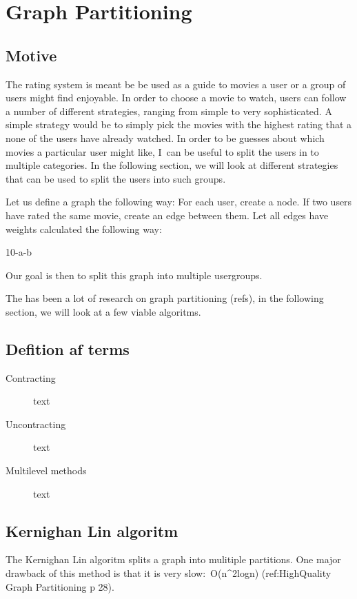 \newpage
\chapter{Graph Partitioning}
\label{chap:Graph_Partitioning}
\section{Motive}
The rating system is meant  be be used as a guide to  movies a user or a group
of users might find enjoyable. In order to choose a movie to watch, users can follow a
number of different strategies, ranging from simple to very sophisticated.
A simple strategy would be to simply pick the movies with the highest rating
that a none of the users have already watched. In order to be guesses about which movies  a particular user might like, I\ can be useful to split the users in to multiple categories. In the following section, we will look at different strategies that can be used to split the users into such groups.

Let us define a graph the following way:
For each user, create a node.
If two users have rated the same movie, create an edge between them.
Let all edges have weights calculated the following way:

10-\textbar a-b\textbar\ 

Our goal is then to split this graph into multiple usergroups.

The has been a lot of research on graph partitioning (refs), in the following section, we will look at a few viable algoritms.

\section{Defition af terms}

\begin{description}
\item[Contracting] 
text
\item[Uncontracting] 
text
\item[Multilevel methods] 
text

\end{description}\section{Kernighan Lin algoritm}
The Kernighan Lin algoritm splits a graph into mulitiple partitions. One major drawback of this method is that it is very slow:\  O(n^2logn)  (ref:HighQuality Graph Partitioning  p 28). 

